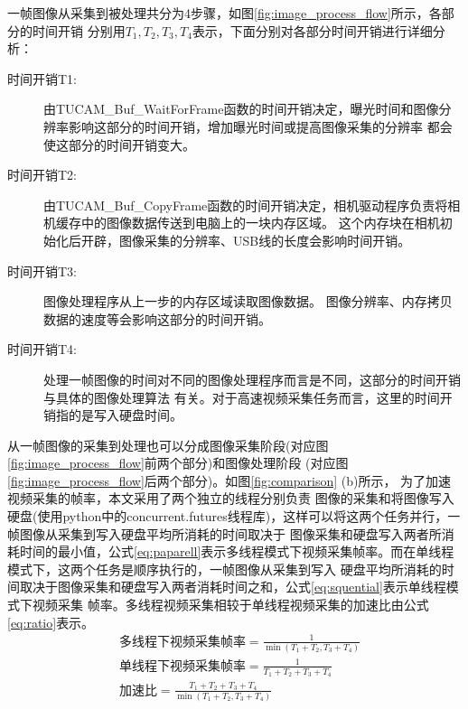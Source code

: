 	一帧图像从采集到被处理共分为4步骤，如图\ref{fig:image_process_flow}所示，各部分的时间开销
	分别用$T_1,T_2,T_3,T_4$表示，下面分别对各部分时间开销进行详细分析：
	\begin{description}
    \item[时间开销T1:] 由TUCAM\_Buf\_WaitForFrame函数的时间开销决定，曝光时间和图像分辨率影响这部分的时间开销，增加曝光时间或提高图像采集的分辨率
	都会使这部分的时间开销变大。
    \item[时间开销T2:] 由TUCAM\_Buf\_CopyFrame函数的时间开销决定，相机驱动程序负责将相机缓存中的图像数据传送到电脑上的一块内存区域。
	这个内存块在相机初始化后开辟，图像采集的分辨率、USB线的长度会影响时间开销。
    \item[时间开销T3:] 图像处理程序从上一步的内存区域读取图像数据。
					图像分辨率、内存拷贝数据的速度等会影响这部分的时间开销。
	\item[时间开销T4:] 处理一帧图像的时间对不同的图像处理程序而言是不同，这部分的时间开销与具体的图像处理算法
	有关。对于高速视频采集任务而言，这里的时间开销指的是写入硬盘时间。
	\end{description}
	从一帧图像的采集到处理也可以分成图像采集阶段(对应图\ref{fig:image_process_flow}前两个部分)和图像处理阶段
	(对应图\ref{fig:image_process_flow}后两个部分)。如图\ref{fig:comparison} (b)所示，
	为了加速视频采集的帧率，本文采用了两个独立的线程分别负责
	图像的采集和将图像写入硬盘(使用python中的concurrent.futures线程库)，这样可以将这两个任务并行，一帧图像从采集到写入硬盘平均所消耗的时间取决于
	图像采集和硬盘写入两者所消耗时间的最小值，公式\ref{eq:paparell}表示多线程模式下视频采集帧率。而在单线程模式下，这两个任务是顺序执行的，一帧图像从采集到写入
	硬盘平均所消耗的时间取决于图像采集和硬盘写入两者消耗时间之和，公式\ref{eq:squential}表示单线程模式下视频采集
	帧率。多线程视频采集相较于单线程视频采集的加速比由公式\ref{eq:ratio}表示。
	\begin{align}
		&\text{多线程下视频采集帧率}=\frac{1}{\min(T_1+T_2,T_3+T_4)} \label{eq:paparell}\\
		&\text{单线程下视频采集帧率}=\frac{1}{T_1+T_2+T_3+T_4} \label{eq:squential}\\
		&\text{加速比}=\frac{T_1+T_2+T_3+T_4}{\min(T_1+T_2,T_3+T_4)} \label{eq:ratio}
	\end{align}

